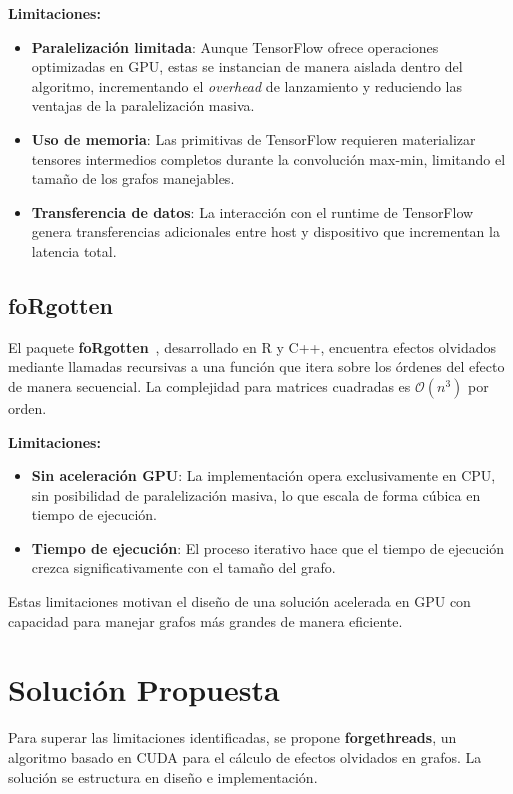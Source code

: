 \documentclass[conference]{IEEEtran}
\begin{document}
\textbf{Limitaciones:}
\begin{itemize}
    \item \textbf{Paralelización limitada}: Aunque TensorFlow ofrece operaciones optimizadas en GPU, estas se instancian de manera aislada dentro del algoritmo, incrementando el \textit{overhead} de lanzamiento y reduciendo las ventajas de la paralelización masiva.
    \item \textbf{Uso de memoria}: Las primitivas de TensorFlow requieren materializar tensores intermedios completos durante la convolución max-min, limitando el tamaño de los grafos manejables.
    \item \textbf{Transferencia de datos}: La interacción con el runtime de TensorFlow genera transferencias adicionales entre host y dispositivo que incrementan la latencia total.
\end{itemize}

\subsection{foRgotten}

El paquete \textbf{foRgotten}~\cite{elliott}, desarrollado en R y C++, encuentra efectos olvidados mediante llamadas recursivas a una función que itera sobre los órdenes del efecto de manera secuencial. La complejidad para matrices cuadradas es $\mathcal{O}(n^3)$ por orden.

\textbf{Limitaciones:}
\begin{itemize}
    \item \textbf{Sin aceleración GPU}: La implementación opera exclusivamente en CPU, sin posibilidad de paralelización masiva, lo que escala de forma cúbica en tiempo de ejecución.
    \item \textbf{Tiempo de ejecución}: El proceso iterativo hace que el tiempo de ejecución crezca significativamente con el tamaño del grafo.
\end{itemize}

Estas limitaciones motivan el diseño de una solución acelerada en GPU con capacidad para manejar grafos más grandes de manera eficiente.

\section{Solución Propuesta}
\label{sec:solution}

Para superar las limitaciones identificadas, se propone \textbf{forgethreads}, un algoritmo basado en CUDA para el cálculo de efectos olvidados en grafos. La solución se estructura en diseño e implementación.
\end{document}
